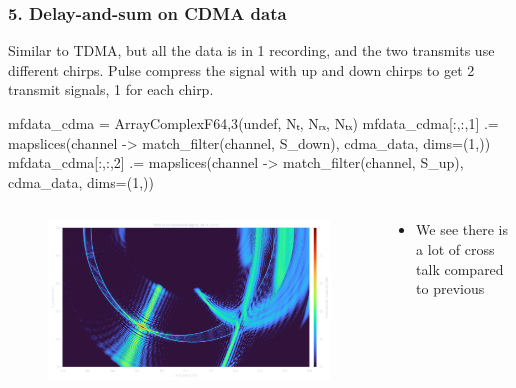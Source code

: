 \documentclass[compress,aspectratio=169]{beamer}
\begin{document}
\begin{frame}[fragile] %
    \frametitle{5. Delay-and-sum on CDMA data}
    Similar to TDMA, but all the data is in 1 recording, and the two transmits
    use different chirps. Pulse compress the signal with up and down chirps to
    get 2 transmit signals, 1 for each chirp.
    \begin{jllisting}[gobble=8]
        mfdata_cdma = Array{ComplexF64,3}(undef, Nₜ, Nᵣₓ, Nₜₓ)
        mfdata_cdma[:,:,1] .= mapslices(channel -> match_filter(channel, S_down), cdma_data, dims=(1,))
        mfdata_cdma[:,:,2] .= mapslices(channel -> match_filter(channel, S_up),   cdma_data, dims=(1,))
    \end{jllisting}
    \begin{columns}
        \begin{column}{0.5\textwidth}
            \begin{figure}
                \includegraphics[width=1.0\columnwidth]{"../9.png"}
            \end{figure}
        \end{column}
        \begin{column}{0.5\textwidth}
            \begin{itemize}
                \item We see there is a lot of cross talk compared to previous
            \end{itemize}
        \end{column}
    \end{columns}
\end{frame} 
\end{document}
